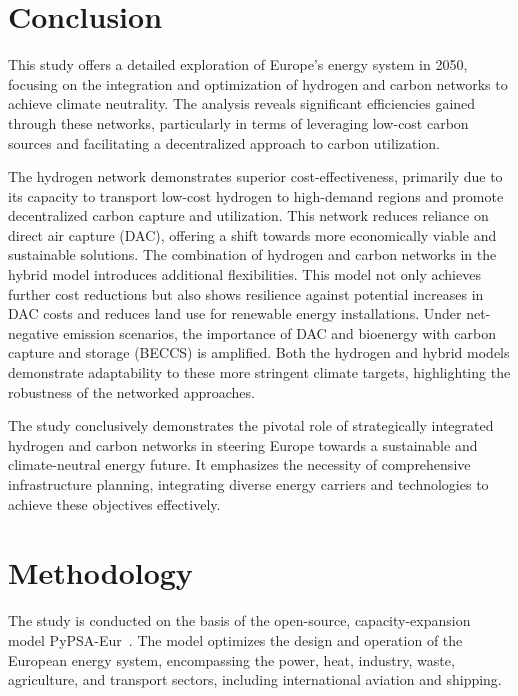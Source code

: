 \documentclass[twocolumn]{article}
\begin{document}
\section{Conclusion}
\label{sec:conclusion}

This study offers a detailed exploration of Europe's energy system in 2050, focusing on the integration and optimization of hydrogen and carbon networks to achieve climate neutrality. The analysis reveals significant efficiencies gained through these networks, particularly in terms of leveraging low-cost carbon sources and facilitating a decentralized approach to carbon utilization.

The hydrogen network demonstrates superior cost-effectiveness, primarily due to its capacity to transport low-cost hydrogen to high-demand regions and promote decentralized carbon capture and utilization. This network reduces reliance on direct air capture (DAC), offering a shift towards more economically viable and sustainable solutions.
The combination of hydrogen and carbon networks in the hybrid model introduces additional flexibilities. This model not only achieves further cost reductions but also shows resilience against potential increases in DAC costs and reduces land use for renewable energy installations.
Under net-negative emission scenarios, the importance of DAC and bioenergy with carbon capture and storage (BECCS) is amplified. Both the hydrogen and hybrid models demonstrate adaptability to these more stringent climate targets, highlighting the robustness of the networked approaches.


The study conclusively demonstrates the pivotal role of strategically integrated hydrogen and carbon networks in steering Europe towards a sustainable and climate-neutral energy future. It emphasizes the necessity of comprehensive infrastructure planning, integrating diverse energy carriers and technologies to achieve these objectives effectively.


\section{Methodology}
\label{sec:methodology}

The study is conducted on the basis of the open-source, capacity-expansion model PyPSA-Eur~\cite{horschPyPSAEurOpenOptimisation2018,brownSynergiesSectorCoupling2018,PyPSAEurSecSectorCoupledOpen2023}.
The model optimizes the design and operation of the European energy system, encompassing the power, heat, industry, waste, agriculture, and transport sectors, including international aviation and shipping.
\end{document}
